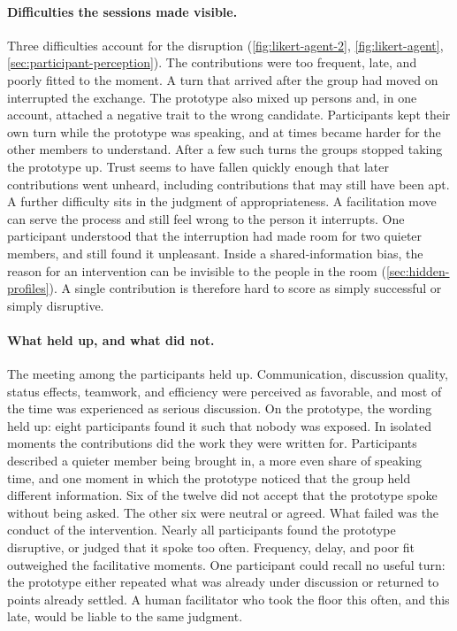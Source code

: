\paragraph{Difficulties the sessions made visible.}
Three difficulties account for the disruption
(\autoref{fig:likert-agent-2}, \autoref{fig:likert-agent},
\autoref{sec:participant-perception}).
The contributions were too frequent, late, and poorly fitted to the moment.
A turn that arrived after the group had moved on interrupted the exchange.
The prototype also mixed up persons and, in one account, attached a negative trait
to the wrong candidate.
Participants kept their own turn while the prototype was speaking, and at times
became harder for the other members to understand.
After a few such turns the groups stopped taking the prototype up.
Trust seems to have fallen quickly enough that later contributions went
unheard, including contributions that may still have been apt.
A further difficulty sits in the judgment of appropriateness.
A facilitation move can serve the process and still feel wrong to the person
it interrupts.
One participant understood that the interruption had made room for two quieter
members, and still found it unpleasant.
Inside a shared-information bias, the reason for an intervention can be
invisible to the people in the room
(\autoref{sec:hidden-profiles}).
A single contribution is therefore hard to score as simply successful or
simply disruptive.

\paragraph{What held up, and what did not.}
The meeting among the participants held up.
Communication, discussion quality, status effects, teamwork, and efficiency
were perceived as favorable, and most of the time was experienced as serious
discussion.
On the prototype, the wording held up: eight participants found it such that
nobody was exposed.
In isolated moments the contributions did the work they were written for.
Participants described a quieter member being brought in, a more even share of
speaking time, and one moment in which the prototype noticed that the group held
different information.
Six of the twelve did not accept that the prototype spoke without being asked.
The other six were neutral or agreed.
What failed was the conduct of the intervention.
Nearly all participants found the prototype disruptive, or judged that it spoke
too often.
Frequency, delay, and poor fit outweighed the facilitative moments.
One participant could recall no useful turn: the prototype either repeated what
was already under discussion or returned to points already settled.
A human facilitator who took the floor this often, and this late, would be
liable to the same judgment.

